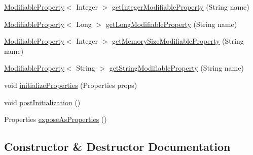 \begin{DoxyCompactItemize}
\item 
\mbox{\hyperlink{interfacecom_1_1mysql_1_1cj_1_1conf_1_1_modifiable_property}{Modifiable\+Property}}$<$ Integer $>$ \mbox{\hyperlink{classcom_1_1mysql_1_1cj_1_1conf_1_1_default_property_set_a24f6c3107ffad2e900facd8f89f91029}{get\+Integer\+Modifiable\+Property}} (String name)
\item 
\mbox{\hyperlink{interfacecom_1_1mysql_1_1cj_1_1conf_1_1_modifiable_property}{Modifiable\+Property}}$<$ Long $>$ \mbox{\hyperlink{classcom_1_1mysql_1_1cj_1_1conf_1_1_default_property_set_a5099422aad8cc1a99c4b0f037d661237}{get\+Long\+Modifiable\+Property}} (String name)
\item 
\mbox{\hyperlink{interfacecom_1_1mysql_1_1cj_1_1conf_1_1_modifiable_property}{Modifiable\+Property}}$<$ Integer $>$ \mbox{\hyperlink{classcom_1_1mysql_1_1cj_1_1conf_1_1_default_property_set_a6c2860544a6fc9ea0c1aab92e1db6ae6}{get\+Memory\+Size\+Modifiable\+Property}} (String name)
\item 
\mbox{\hyperlink{interfacecom_1_1mysql_1_1cj_1_1conf_1_1_modifiable_property}{Modifiable\+Property}}$<$ String $>$ \mbox{\hyperlink{classcom_1_1mysql_1_1cj_1_1conf_1_1_default_property_set_a44d16d90d0307d426c319163a8a0811e}{get\+String\+Modifiable\+Property}} (String name)
\item 
void \mbox{\hyperlink{classcom_1_1mysql_1_1cj_1_1conf_1_1_default_property_set_aca8a98e7e0fa72d07fde37a0e7b03fbe}{initialize\+Properties}} (Properties props)
\item 
void \mbox{\hyperlink{classcom_1_1mysql_1_1cj_1_1conf_1_1_default_property_set_a56846f6e28845150a83181734f800215}{post\+Initialization}} ()
\item 
Properties \mbox{\hyperlink{classcom_1_1mysql_1_1cj_1_1conf_1_1_default_property_set_ace49d9662de4376583ef44bc172e71fe}{expose\+As\+Properties}} ()
\end{DoxyCompactItemize}


\subsection{Constructor \& Destructor Documentation}
\mbox{\label{classcom_1_1mysql_1_1cj_1_1conf_1_1_default_property_set_a360df216fd0e3e7e250e3ccf93ad637a}} 
